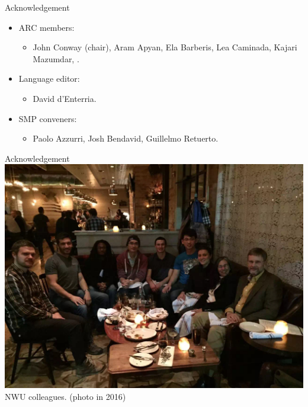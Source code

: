 \begin{frame}{Acknowledgement}
    
    \begin{itemize}
        \item ARC members: 
        \begin{itemize}
        \smaller 
            \item John Conway (chair), Aram Apyan, Ela Barberis, Lea Caminada, Kajari Mazumdar, .
        \end{itemize}
        
        \item Language editor: 
        \begin{itemize}
        \smaller 
            \item David d'Enterria.
        \end{itemize}
        
        \item SMP conveners:
        \begin{itemize}
        \smaller 
            \item Paolo Azzurri, Josh Bendavid, Guillelmo Retuerto.
        \end{itemize}
    \end{itemize}
\end{frame}


\begin{frame}{Acknowledgement}
    \centering
    \includegraphics[height=0.7\textheight]{slides/figures/nuhep.JPG} \\
    NWU colleagues. (photo in 2016)
\end{frame}



